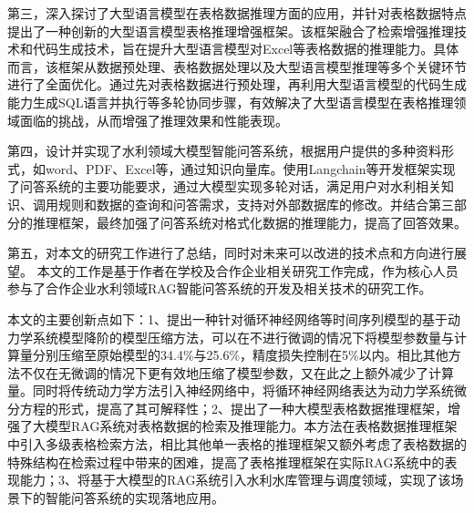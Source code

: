 第三，深入探讨了大型语言模型在表格数据推理方面的应用，并针对表格数据特点提出了一种创新的大型语言模型表格推理增强框架。该框架融合了检索增强推理技术和代码生成技术，旨在提升大型语言模型对Excel等表格数据的推理能力。具体而言，该框架从数据预处理、表格数据处理以及大型语言模型推理等多个关键环节进行了全面优化。通过先对表格数据进行预处理，再利用大型语言模型的代码生成能力生成SQL语言并执行等多轮协同步骤，有效解决了大型语言模型在表格推理领域面临的挑战，从而增强了推理效果和性能表现。

第四，设计并实现了水利领域大模型智能问答系统，根据用户提供的多种资料形式，如word、PDF、Excel等，通过知识向量库。使用Langchain等开发框架实现了问答系统的主要功能要求，通过大模型实现多轮对话，满足用户对水利相关知识、调用规则和数据的查询和问答需求，支持对外部数据库的修改。并结合第三部分的推理框架，最终加强了问答系统对格式化数据的推理能力，提高了回答效果。

第五，对本文的研究工作进行了总结，同时对未来可以改进的技术点和方向进行展望。
本文的工作是基于作者在学校及合作企业相关研究工作完成，作为核心人员参与了合作企业水利领域RAG智能问答系统的开发及相关技术的研究工作。


本文的主要创新点如下：1、提出一种针对循环神经网络等时间序列模型的基于动力学系统模型降阶的模型压缩方法，可以在不进行微调的情况下将模型参数量与计算量分别压缩至原始模型的34.4\%与25.6\%，精度损失控制在5\%以内。相比其他方法不仅在无微调的情况下更有效地压缩了模型参数，又在此之上额外减少了计算量。同时将传统动力学方法引入神经网络中，将循环神经网络表达为动力学系统微分方程的形式，提高了其可解释性；2、提出了一种大模型表格数据推理框架，增强了大模型RAG系统对表格数据的检索及推理能力。本方法在表格数据推理框架中引入多级表格检索方法，相比其他单一表格的推理框架又额外考虑了表格数据的特殊结构在检索过程中带来的困难，提高了表格推理框架在实际RAG系统中的表现能力；3、将基于大模型的RAG系统引入水利水库管理与调度领域，实现了该场景下的智能问答系统的实现落地应用。

